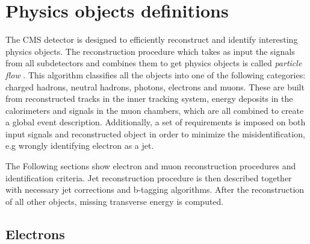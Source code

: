 \chapter{Physics objects definitions} %

\label{Chapter5} %


The CMS detector is designed to efficiently reconstruct and identify interesting physics objects. The reconstruction procedure which takes as input the signals from all subdetectors and combines them to get physics objects is called \textit{particle flow} \cite{CMS:2009nxa}. This algorithm classifies all the objects into one of the following categories: charged hadrons, neutral hadrons, photons, electrons and muons. These are built from reconstructed tracks in the inner tracking system, energy deposits in the calorimeters and signals in the muon chambers, which are all combined to create a global event description. Additionally, a set of requirements is imposed on both input signals and reconstructed object in order to minimize the misidentification, e.g wrongly identifying electron as a jet. 
\par The Following sections show electron and muon reconstruction procedures and identification criteria. Jet reconstruction procedure is then described together with necessary jet corrections and b-tagging algorithms. After the reconstruction of all other objects, missing transverse energy is computed.


\section{Electrons}

